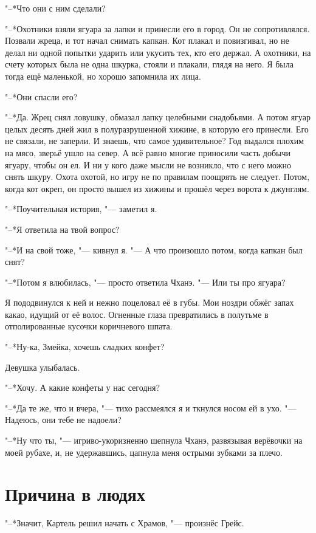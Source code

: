 "--*Что они с ним сделали?

"--*Охотники взяли ягуара за лапки и принесли его в город.
Он не сопротивлялся.
Позвали жреца, и тот начал снимать капкан.
Кот плакал и повизгивал, но не делал ни одной попытки ударить или укусить тех, кто его держал.
А охотники, на счету которых была не одна шкурка, стояли и плакали, глядя на него.
Я была тогда ещё маленькой, но хорошо запомнила их лица.

"--*Они спасли его?

"--*Да.
Жрец снял ловушку, обмазал лапку целебными снадобьями.
А потом ягуар целых десять дней жил в полуразрушенной хижине, в которую его принесли.
Его не связали, не заперли.
И знаешь, что самое удивительное?
Год выдался плохим на мясо, зверьё ушло на север.
А всё равно многие приносили часть добычи ягуару, чтобы он ел.
И ни у кого даже мысли не возникло, что с него можно снять шкуру.
Охота охотой, но игру не по правилам поощрять не следует.
Потом, когда кот окреп, он просто вышел из хижины и прошёл через ворота к джунглям.

"--*Поучительная история, "--- заметил я.

"--*Я ответила на твой вопрос?

"--*И на свой тоже, "--- кивнул я.
"--- А что произошло потом, когда капкан был снят?

"--*Потом я влюбилась, "--- просто ответила Чханэ.
"--- Или ты про ягуара?

Я пододвинулся к ней и нежно поцеловал её в губы.
Мои ноздри обжёг запах какао, идущий от её волос.
Огненные глаза превратились в полутьме в отполированные кусочки коричневого шпата.

"--*Ну-ка, Змейка, хочешь сладких конфет?

Девушка улыбалась.

"--*Хочу.
А какие конфеты у нас сегодня?

"--*Да те же, что и вчера, "--- тихо рассмеялся я и ткнулся носом ей в ухо.
"--- Надеюсь, они тебе не надоели?

"--*Ну что ты, "--- игриво-укоризненно шепнула Чханэ, развязывая верёвочки на моей рубахе, и, не удержавшись, цапнула меня острыми зубками за плечо.

\section{Причина в людях}

"--*Значит, Картель решил начать с Храмов, "--- произнёс Грейс.

